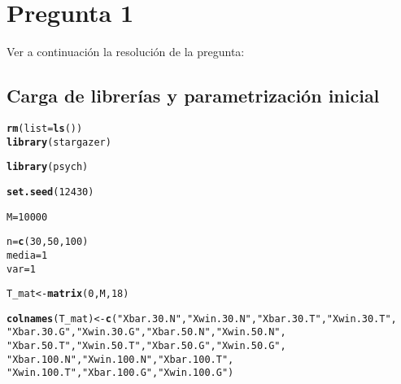 \documentclass{article}\usepackage[]{graphicx}\usepackage[]{color}
\makeatletter
\newcommand{\hlnum}[1]{\textcolor[rgb]{0.686,0.059,0.569}{#1}}%
\newcommand{\hlstr}[1]{\textcolor[rgb]{0.192,0.494,0.8}{#1}}%
\newcommand{\hlstd}[1]{\textcolor[rgb]{0.345,0.345,0.345}{#1}}%
\newcommand{\hlkwb}[1]{\textcolor[rgb]{0.69,0.353,0.396}{#1}}%
\newcommand{\hlkwc}[1]{\textcolor[rgb]{0.333,0.667,0.333}{#1}}%
\newcommand{\hlkwd}[1]{\textcolor[rgb]{0.737,0.353,0.396}{\textbf{#1}}}%
\newenvironment{kframe}{%
 \def\at@end@of@kframe{}%
 \ifinner\ifhmode%
  \def\at@end@of@kframe{\end{minipage}}%
  \begin{minipage}{\columnwidth}%
 \fi\fi%
 \def\FrameCommand##1{\hskip\@totalleftmargin \hskip-\fboxsep
 \colorbox{shadecolor}{##1}\hskip-\fboxsep
     \hskip-\linewidth \hskip-\@totalleftmargin \hskip\columnwidth}%
 \MakeFramed {\advance\hsize-\width
   \@totalleftmargin\z@ \linewidth\hsize
   \@setminipage}}%
 {\par\unskip\endMakeFramed%
 \at@end@of@kframe}
\newenvironment{knitrout}{}{} %
\makeatother
\begin{document}
\section*{Pregunta 1}

Ver a continuación la resolución de la pregunta:

\subsection*{Carga de librerías y parametrización inicial}

\begin{knitrout}
\color{fgcolor}\begin{kframe}
\begin{alltt}
\hlkwd{rm}\hlstd{(}\hlkwc{list}\hlstd{=}\hlkwd{ls}\hlstd{())}
\hlkwd{library}\hlstd{(stargazer)}
\end{alltt}


{\ttfamily\noindent\itshape\color{messagecolor}{\#\# \\\#\# Please cite as:}}

{\ttfamily\noindent\itshape\color{messagecolor}{\#\#\ \ Hlavac, Marek (2018). stargazer: Well-Formatted Regression and Summary Statistics Tables.}}

{\ttfamily\noindent\itshape\color{messagecolor}{\#\#\ \ R package version 5.2.2. https://CRAN.R-project.org/package=stargazer}}\begin{alltt}
\hlkwd{library}\hlstd{(psych)}
\end{alltt}


{\ttfamily\noindent\color{warningcolor}{\#\# Warning: package 'psych' was built under R version 3.5.3}}\begin{alltt}
\hlkwd{set.seed}\hlstd{(}\hlnum{12430}\hlstd{)}

\hlstd{M} \hlkwb{=} \hlnum{10000}

\hlstd{n} \hlkwb{=} \hlkwd{c}\hlstd{(}\hlnum{30}\hlstd{,}\hlnum{50}\hlstd{,}\hlnum{100}\hlstd{)}
\hlstd{media} \hlkwb{=} \hlnum{1}
\hlstd{var} \hlkwb{=} \hlnum{1}

\hlstd{T_mat}\hlkwb{<-}\hlkwd{matrix}\hlstd{(}\hlnum{0}\hlstd{,M,}\hlnum{18}\hlstd{)}

\hlkwd{colnames}\hlstd{(T_mat)}\hlkwb{<-}\hlkwd{c}\hlstd{(}\hlstr{"Xbar.30.N"}\hlstd{,}\hlstr{"Xwin.30.N"}\hlstd{,}\hlstr{"Xbar.30.T"}\hlstd{,}\hlstr{"Xwin.30.T"}\hlstd{,}
                   \hlstr{"Xbar.30.G"}\hlstd{,}\hlstr{"Xwin.30.G"}\hlstd{,}\hlstr{"Xbar.50.N"}\hlstd{,}\hlstr{"Xwin.50.N"}\hlstd{,}
                   \hlstr{"Xbar.50.T"}\hlstd{,}\hlstr{"Xwin.50.T"}\hlstd{,}\hlstr{"Xbar.50.G"}\hlstd{,}\hlstr{"Xwin.50.G"}\hlstd{,}
                   \hlstr{"Xbar.100.N"}\hlstd{,}\hlstr{"Xwin.100.N"}\hlstd{,}\hlstr{"Xbar.100.T"}\hlstd{,}
                   \hlstr{"Xwin.100.T"}\hlstd{,}\hlstr{"Xbar.100.G"}\hlstd{,}\hlstr{"Xwin.100.G"}\hlstd{)}
\end{alltt}
\end{kframe}
\end{knitrout}
\end{document}

